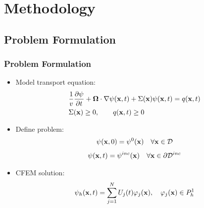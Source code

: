 \documentclass{beamer}
\begin{document}
\section{Methodology}
\subsection{Problem Formulation}
\begin{frame}
\frametitle{Problem Formulation}

\begin{itemize}
   \item Model transport equation:
   \begin{align}\label{eq:tr}
      &\frac{1}{v}\frac{\partial \psi}{\partial t} + \mathbf{\Omega}\cdot\nabla \psi(\mathbf{x},t)
      + \Sigma(\mathbf{x})\psi(\mathbf{x},t) = q(\mathbf{x},t)\\
      &\Sigma(\mathbf{x})\ge 0,\qquad q(\mathbf{x},t)\ge 0\nonumber
   \end{align}
   \item Define problem:
   \begin{equation}
      \psi(\mathbf{x},0) = \psi^0(\mathbf{x}) \quad \forall \mathbf{x}\in \mathcal{D}
   \end{equation}
   \begin{equation}
      \psi(\mathbf{x},t) = \psi^{inc}(\mathbf{x}) \quad \forall \mathbf{x}\in \partial \mathcal{D}^{inc}
   \end{equation}
   \item CFEM solution:
   \begin{equation}
      \psi_h(\mathbf{x},t) = \sum\limits_{j=1}^N U_j(t) \varphi_j(\mathbf{x}),
      \quad \varphi_j(\mathbf{x})\in P^1_h
   \end{equation}
\end{itemize}

\end{frame}
\end{document}
